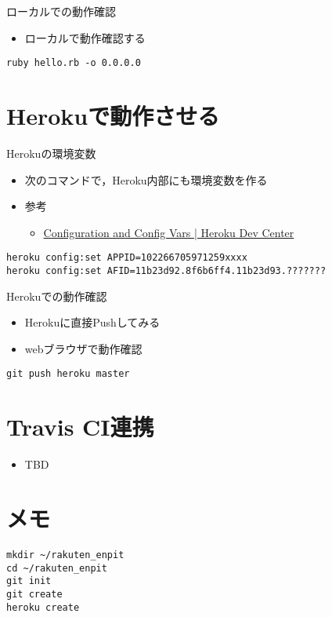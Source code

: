 \documentclass[t]{beamer}
\begin{document}
\begin{frame}[fragile,label=sec-1-5]{ローカルでの動作確認}
 \begin{itemize}
\item ローカルで動作確認する
\end{itemize}

\begin{verbatim}
ruby hello.rb -o 0.0.0.0
\end{verbatim}
\end{frame}
\section{Herokuで動作させる}
\label{sec-2}
\begin{frame}[fragile,label=sec-2-1]{Herokuの環境変数}
 \begin{itemize}
\item 次のコマンドで，Heroku内部にも環境変数を作る
\item 参考
\begin{itemize}
\item \href{https://devcenter.heroku.com/articles/config-vars}{Configuration and Config Vars | Heroku Dev Center}
\end{itemize}
\end{itemize}

\begin{verbatim}
heroku config:set APPID=102266705971259xxxx
heroku config:set AFID=11b23d92.8f6b6ff4.11b23d93.???????
\end{verbatim}
\end{frame}
\begin{frame}[fragile,label=sec-2-2]{Herokuでの動作確認}
 \begin{itemize}
\item Herokuに直接Pushしてみる
\item webブラウザで動作確認
\end{itemize}

\begin{verbatim}
git push heroku master
\end{verbatim}
\end{frame}
\section{Travis CI連携}
\label{sec-3}
\begin{itemize}
\item TBD
\end{itemize}

\section{メモ}
\label{sec-4}

\begin{verbatim}
mkdir ~/rakuten_enpit
cd ~/rakuten_enpit
git init
git create
heroku create
\end{verbatim}
\end{document}
